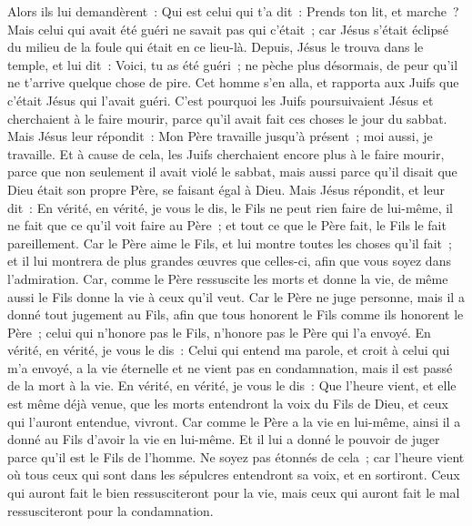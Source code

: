 \begin{multicols}{2}
Alors ils lui demandèrent~: Qui est celui qui t'a dit~: Prends ton lit, et marche~?
Mais celui qui avait été guéri ne savait pas qui c'était~; car Jésus s'était éclipsé du milieu de la foule qui était en ce lieu-là.
Depuis, Jésus le trouva dans le temple, et lui dit~: Voici, tu as été guéri~; ne pèche plus désormais, de peur qu'il ne t'arrive quelque chose de pire.
Cet homme s'en alla, et rapporta aux Juifs que c'était Jésus qui l'avait guéri.
C'est pourquoi les Juifs poursuivaient Jésus et cherchaient à le faire mourir, parce qu'il avait fait ces choses le jour du sabbat.
Mais Jésus leur répondit~: Mon Père travaille jusqu'à présent~; moi aussi, je travaille.
Et à cause de cela, les Juifs cherchaient encore plus à le faire mourir, parce que non seulement il avait violé le sabbat, mais aussi parce qu'il disait que Dieu était son propre Père, se faisant égal à Dieu.
Mais Jésus répondit, et leur dit~: En vérité, en vérité, je vous le dis, le Fils ne peut rien faire de lui-même, il ne fait que ce qu'il voit faire au Père~; et tout ce que le Père fait, le Fils le fait pareillement.
Car le Père aime le Fils, et lui montre toutes les choses qu'il fait~; et il lui montrera de plus grandes œuvres que celles-ci, afin que vous soyez dans l'admiration.
Car, comme le Père ressuscite les morts et donne la vie, de même aussi le Fils donne la vie à ceux qu'il veut.
Car le Père ne juge personne, mais il a donné tout jugement au Fils,
afin que tous honorent le Fils comme ils honorent le Père~; celui qui n'honore pas le Fils, n'honore pas le Père qui l'a envoyé.
En vérité, en vérité, je vous le dis~: Celui qui entend ma parole, et croit à celui qui m'a envoyé, a la vie éternelle et ne vient pas en condamnation, mais il est passé de la mort à la vie.
En vérité, en vérité, je vous le dis~: Que l'heure vient, et elle est même déjà venue, que les morts entendront la voix du Fils de Dieu, et ceux qui l'auront entendue, vivront.
Car comme le Père a la vie en lui-même, ainsi il a donné au Fils d'avoir la vie en lui-même.
Et il lui a donné le pouvoir de juger parce qu'il est le Fils de l'homme.
Ne soyez pas étonnés de cela~; car l'heure vient où tous ceux qui sont dans les sépulcres entendront sa voix, et en sortiront.
 Ceux qui auront fait le bien ressusciteront pour la vie, mais ceux qui auront fait le mal ressusciteront pour la condamnation.

\end{multicols}
